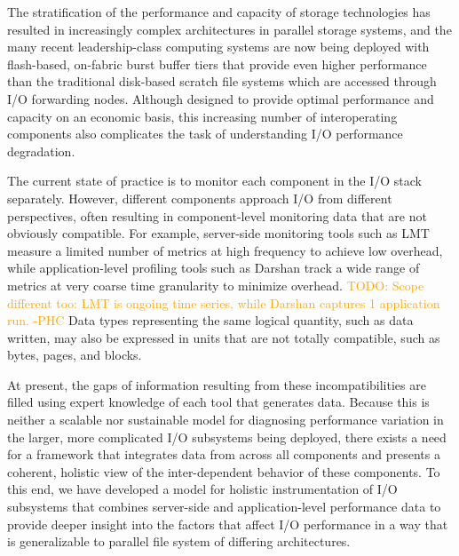 \documentclass[conference,10pt,compsocconf]{IEEEtran}
\newcommand{\todo}[1]{\textcolor{Orange}{TODO: #1}}
\begin{document}
The stratification of the performance and capacity of storage technologies has
resulted in increasingly complex architectures in parallel storage systems, and
the many recent leadership-class computing systems are now being deployed with
flash-based, on-fabric burst buffer tiers\cite{Henseler2016} that provide even higher performance
than the traditional disk-based scratch file systems which are accessed through
I/O forwarding nodes\cite{Bhimji2016}.  Although designed to provide optimal performance and
capacity on an economic basis, this increasing number of interoperating
components also complicates the task of understanding I/O performance
degradation.


The current state of practice is to monitor each component in the I/O stack
separately.  However, different components approach I/O from different
perspectives, often resulting in component-level monitoring data that are not
obviously compatible.  For example, server-side monitoring tools such as
LMT\cite{lmt} measure a limited number of metrics at high frequency to achieve
low overhead, while application-level profiling tools such as
Darshan\cite{carns200924} track a wide range of metrics at very coarse time
granularity to minimize overhead.  \todo{Scope different too: LMT is ongoing
time series, while Darshan captures 1 application run. -PHC}
Data types representing the same logical
quantity, such as data written, may also be expressed in units that are not
totally compatible, such as bytes, pages, and blocks.


At present, the gaps of information resulting from these incompatibilities are
filled using expert knowledge of each tool that generates data.  Because this is
neither a scalable nor sustainable model for diagnosing performance variation in
the larger, more complicated I/O subsystems being deployed, there exists a need
for a framework that integrates data from across all components and presents a
coherent, holistic view of the inter-dependent behavior of these components.  To
this end, we have developed a model for holistic instrumentation of I/O
subsystems that combines server-side and application-level performance data to
provide deeper insight into the factors that affect I/O performance in a way
that is generalizable to parallel file system of differing architectures.
\end{document}
